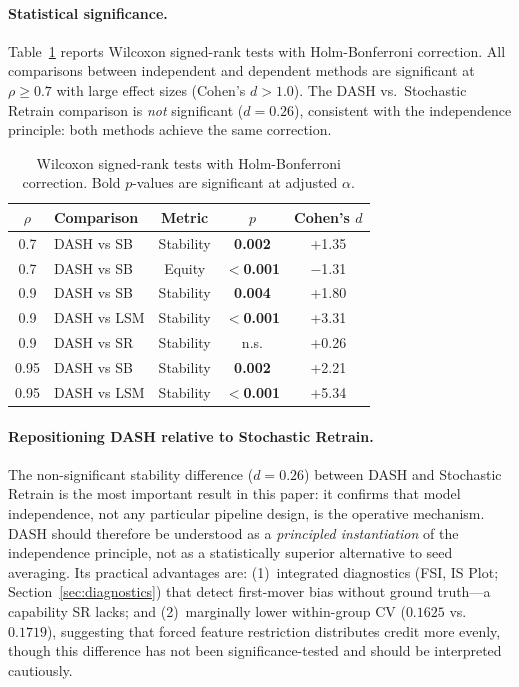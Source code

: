 \documentclass[11pt]{article}
\newcommand{\dash}{\textsc{DASH}}
\newcommand{\rhovar}{\rho}
\begin{document}
\paragraph{Statistical significance.}
Table~\ref{tab:significance} reports Wilcoxon signed-rank tests with
Holm-Bonferroni correction. All comparisons between independent and
dependent methods are significant at $\rhovar \geq 0.7$ with large
effect sizes (Cohen's $d > 1.0$). The \dash{} vs.\ Stochastic Retrain
comparison is \emph{not} significant ($d = 0.26$), consistent with
the independence principle: both methods achieve the same correction.

\begin{table}[h]
\centering
\caption{Wilcoxon signed-rank tests with Holm-Bonferroni correction.
Bold $p$-values are significant at adjusted $\alpha$.}
\label{tab:significance}
\small
\begin{tabular}{clccc}
\toprule
$\rhovar$ & \textbf{Comparison} & \textbf{Metric} & $p$ & Cohen's $d$ \\
\midrule
0.7  & DASH vs SB  & Stability & \textbf{0.002} & +1.35 \\
0.7  & DASH vs SB  & Equity   & \textbf{$<$0.001} & $-$1.31 \\
0.9  & DASH vs SB  & Stability & \textbf{0.004} & +1.80 \\
0.9  & DASH vs LSM & Stability & \textbf{$<$0.001} & +3.31 \\
0.9  & DASH vs SR  & Stability & n.s. & +0.26 \\
0.95 & DASH vs SB  & Stability & \textbf{0.002} & +2.21 \\
0.95 & DASH vs LSM & Stability & \textbf{$<$0.001} & +5.34 \\
\bottomrule
\end{tabular}
\end{table}

\paragraph{Repositioning \dash{} relative to Stochastic Retrain.}
The non-significant stability difference ($d = 0.26$) between \dash{}
and Stochastic Retrain is the most important result in this paper: it
confirms that model independence, not any particular pipeline design, is
the operative mechanism. \dash{} should therefore be understood as a
\emph{principled instantiation} of the independence principle, not as a
statistically superior alternative to seed averaging. Its practical
advantages are: (1)~integrated diagnostics (FSI, IS Plot;
Section~\ref{sec:diagnostics}) that detect first-mover bias without
ground truth---a capability SR lacks; and (2)~marginally lower
within-group CV ($0.1625$ vs.\ $0.1719$), suggesting that forced feature
restriction distributes credit more evenly, though this difference has
not been significance-tested and should be interpreted cautiously.
\end{document}
